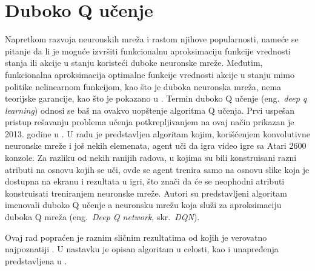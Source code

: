 

\section{Duboko Q učenje}

Napretkom razvoja neuronskih mreža i rastom njihove popularnosti, nameće se pitanje da li je moguće izvršiti funkcionalnu aproksimaciju funkcije vrednosti stanja ili akcije u stanju koristeći duboke neuronske mreže. Međutim, funkcionalna aproksimacija optimalne funkcije vrednosti akcije u stanju mimo politike nelinearnom funkcijom, kao što je duboka neuronska mreža, nema teorijske garancije, kao što je pokazano u \cite{q_nn_div}.  Termin duboko Q učenje (eng.~{\em deep q learning}) odnosi se baš na ovakvo uopštenje algoritma Q učenja. Prvi uspešan pristup rešavanju problema učenja potkrepljivanjem na ovaj način prikazan je 2013. godine u \cite{dqn_mnih}. U radu je predstavljen algoritam kojim, korišćenjem konvolutivne neuronske mreže i još nekih elemenata, agent uči da igra video igre sa Atari 2600 konzole. Za razliku od nekih ranijih radova, u kojima su bili konstruisani razni atributi na osnovu kojih se uči, ovde se agent trenira samo na osnovu slike koja je dostupna na ekranu i rezultata u igri, što znači da će se neophodni atributi konstruisati treniranjem neuronske mreže. 
Autori su predstavljeni algoritam imenovali duboko Q učenje a neuronsku mrežu koja služi za aproksimaciju duboka Q mreža (eng.~{\em Deep Q network}, skr.~{\em DQN}).
\par 
Ovaj rad popraćen je raznim sličnim rezultatima od kojih je verovatno najpoznatiji \cite{dqn_dm}.  U nastavku je opisan algoritam u celosti, kao i unapređenja predstavljena u \cite{dqn_mnih}.

